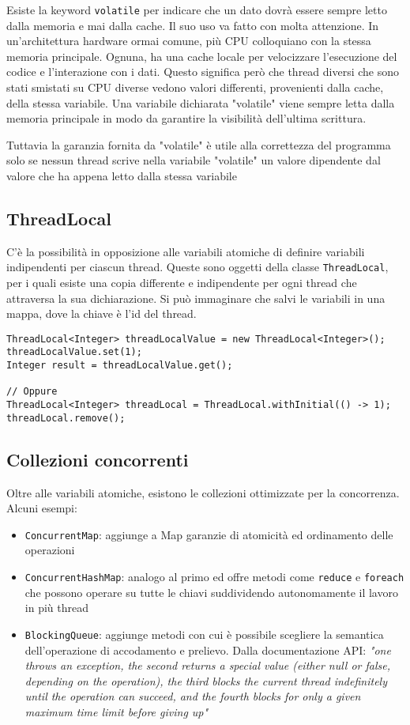 Esiste la keyword \texttt{volatile} per indicare che un dato dovrà essere sempre letto dalla memoria e mai dalla cache. Il suo uso va fatto con molta attenzione. In un'architettura hardware ormai comune, pi\`u CPU colloquiano con la stessa memoria principale. Ognuna, ha una cache locale per velocizzare l'esecuzione del codice e l'interazione con i dati. Questo significa per\`o che thread diversi che sono stati smistati su CPU diverse vedono valori differenti, provenienti dalla cache, della stessa variabile. Una variabile dichiarata "volatile" viene sempre letta dalla memoria principale in modo da garantire la visibilit\`a dell'ultima scrittura.

Tuttavia la garanzia fornita da "volatile" è utile alla correttezza del programma solo se
nessun thread scrive nella variabile "volatile" un valore dipendente dal valore che ha appena letto dalla stessa variabile

\subsection{ThreadLocal}

C'è la possibilità in opposizione alle variabili atomiche di definire variabili indipendenti per ciascun thread. Queste sono oggetti della classe \texttt{ThreadLocal}, per i quali esiste una copia differente e indipendente per ogni thread che attraversa la sua dichiarazione. Si può immaginare che salvi le variabili in una mappa, dove la chiave è l'id del thread.

\begin{lstlisting}
ThreadLocal<Integer> threadLocalValue = new ThreadLocal<Integer>();    
threadLocalValue.set(1);
Integer result = threadLocalValue.get();

// Oppure
ThreadLocal<Integer> threadLocal = ThreadLocal.withInitial(() -> 1);
threadLocal.remove();
\end{lstlisting}

\subsection{Collezioni concorrenti}
Oltre alle variabili atomiche, esistono le collezioni ottimizzate per la concorrenza. Alcuni esempi:
\begin{itemize}
\item \texttt{ConcurrentMap}: aggiunge a Map garanzie di atomicit\`a ed ordinamento delle operazioni
\item \texttt{ConcurrentHashMap}: analogo al primo ed offre metodi come \texttt{reduce} e \texttt{foreach} che possono operare su tutte le chiavi suddividendo autonomamente il lavoro in più thread
\item \texttt{BlockingQueue}: aggiunge metodi con cui è possibile scegliere la semantica dell'operazione di accodamento e prelievo. Dalla documentazione API: \textit{"one throws an exception, the second returns a special value (either null or false, depending on the operation), the third blocks the current thread indefinitely until the operation can succeed, and the fourth blocks for only a given maximum time limit before giving up"}
\end{itemize}


